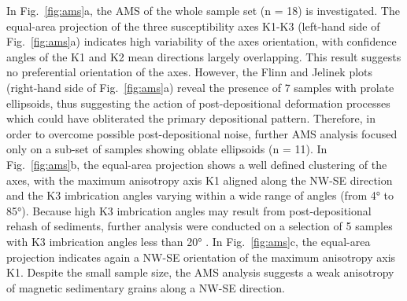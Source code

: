 \documentclass[review,times,authoryear]{elsarticle} %
\begin{document}
In Fig.~\ref{fig:ams}a, the AMS of the whole sample set (n = 18) is investigated. The equal-area projection of the three susceptibility axes K1-K3 (left-hand side of Fig.~\ref{fig:ams}a) indicates high variability of the axes orientation, with confidence angles of the K1 and K2 mean directions largely overlapping. This result suggests no preferential orientation of the axes. However, the Flinn and Jelinek plots (right-hand side of Fig.~\ref{fig:ams}a) reveal the presence of 7 samples with prolate ellipsoids, thus suggesting the action of post-depositional deformation processes which could have obliterated the primary depositional pattern. Therefore, in order to overcome possible post-depositional noise, further AMS analysis focused only on a sub-set of samples showing oblate ellipsoids (n = 11). In Fig.~\ref{fig:ams}b, the equal-area projection shows a well defined clustering of the axes, with the maximum anisotropy axis K1 aligned along the NW-SE direction and the K3 imbrication angles varying within a wide range of angles (from 4° to 85°). Because high K3 imbrication angles may result from post-depositional rehash of sediments, further analysis were conducted on a selection of 5 samples with K3 imbrication angles less than 20° \citep{Hamilton1970,Hrouda1982,Tarling1993,Liu2001,Lanza2006}. In Fig.~\ref{fig:ams}c, the equal-area projection indicates again a NW-SE orientation of the maximum anisotropy axis K1. Despite the small sample size, the AMS analysis suggests a weak anisotropy of magnetic sedimentary grains along a NW-SE direction.
\end{document}
